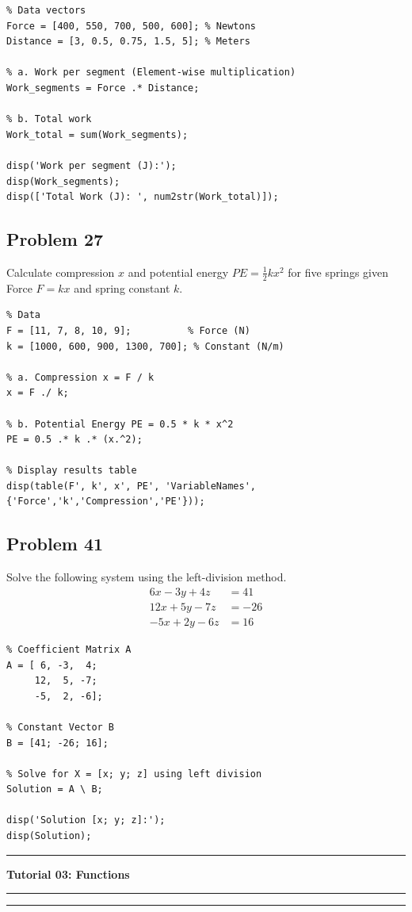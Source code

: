 \documentclass[DIN, pagenumber=false, fontsize=11pt, parskip=half]{scrartcl}
\newcommand{\mypart}[1]{\vspace{1cm}\hrule\vspace{0.5cm}\noindent\textbf{\LARGE #1}\vspace{0.5cm}\hrule\vspace{1cm}}
\newcommand{\myproblem}[1]{\subsection*{#1}}
\begin{document}
\begin{lstlisting}
% Data vectors
Force = [400, 550, 700, 500, 600]; % Newtons
Distance = [3, 0.5, 0.75, 1.5, 5]; % Meters

% a. Work per segment (Element-wise multiplication)
Work_segments = Force .* Distance;

% b. Total work
Work_total = sum(Work_segments);

disp('Work per segment (J):');
disp(Work_segments);
disp(['Total Work (J): ', num2str(Work_total)]);
\end{lstlisting}

\myproblem{Problem 27}
Calculate compression $x$ and potential energy $PE = \frac{1}{2}kx^2$ for five springs given Force $F=kx$ and spring constant $k$.

\begin{lstlisting}
% Data
F = [11, 7, 8, 10, 9];          % Force (N)
k = [1000, 600, 900, 1300, 700]; % Constant (N/m)

% a. Compression x = F / k
x = F ./ k;

% b. Potential Energy PE = 0.5 * k * x^2
PE = 0.5 .* k .* (x.^2);

% Display results table
disp(table(F', k', x', PE', 'VariableNames', {'Force','k','Compression','PE'}));
\end{lstlisting}

\myproblem{Problem 41}
Solve the following system using the left-division method.
\[
\begin{aligned}
6x - 3y + 4z &= 41 \\
12x + 5y - 7z &= -26 \\
-5x + 2y - 6z &= 16
\end{aligned}
\]

\begin{lstlisting}
% Coefficient Matrix A
A = [ 6, -3,  4;
     12,  5, -7;
     -5,  2, -6];

% Constant Vector B
B = [41; -26; 16];

% Solve for X = [x; y; z] using left division
Solution = A \ B;

disp('Solution [x; y; z]:');
disp(Solution);
\end{lstlisting}


\newpage
\label{tut3}
\mypart{Tutorial 03: Functions}


\vspace{1cm}
\hrule
\vspace{0.5cm}
\end{document}
